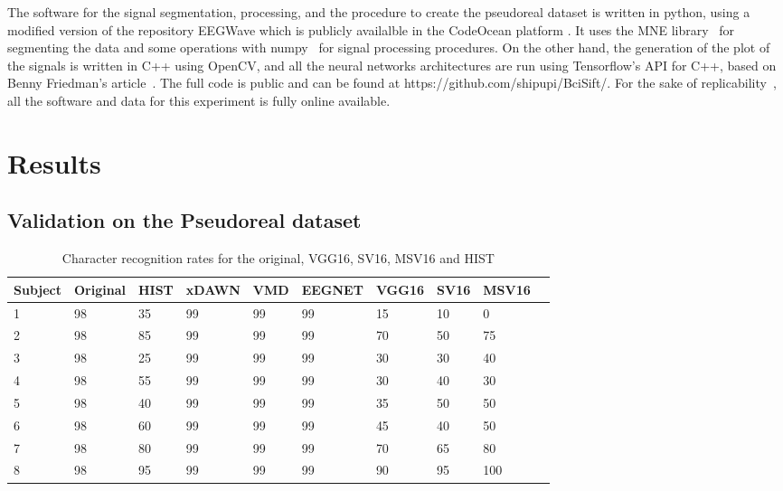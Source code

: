 \documentclass[conference]{IEEEtran}
\begin{document}
The software for the signal segmentation, processing, and the procedure to create the pseudoreal dataset is written in python, using a modified version of the repository EEGWave which is publicly availalble in the CodeOcean platform \cite{Ramele2018EEGWA}. It uses the MNE library~\cite{Gramfort.etal2014} for segmenting the data and some operations with numpy~\cite{Harris.etal2020} for signal processing procedures.
On the other hand, the generation of the plot of the signals is written in C++ using OpenCV, and all the neural networks architectures  are run using Tensorflow's API for C++, based on Benny Friedman's article~\cite{BennyCNN}. The full code is public and can be found at https://github.com/shipupi/BciSift/.  For the sake of replicability~\cite{Pavlov.etal2021}, all the software and data for this experiment is fully online available.

\section{Results}
\label{sec:results}


\subsection{Validation on the Pseudoreal dataset}


\begin{table*}[h]
\centering
\begin{tabular}{ |p{1cm}||p{1cm}|p{1cm}|p{1cm}|p{1cm}|p{1cm}|p{1cm}|p{1cm}|p{1cm}|p{1cm} |}
 \hline
 Subject & Original & HIST & xDAWN & VMD & EEGNET & VGG16 & SV16 & MSV16 \\
 \hline
 1 & 98 & 35 & 99 & 99 & 99 & 15 & 10 & 0 \\
 2 & 98 & 85 & 99 & 99 & 99 & 70 & 50 & 75 \\
 3 & 98 & 25 & 99 & 99 & 99 & 30 & 30 & 40 \\
 4 & 98 & 55 & 99 & 99 & 99 & 30 & 40 & 30 \\
 5 & 98 & 40 & 99 & 99 & 99 & 35 & 50 & 50 \\
 6 & 98 & 60 & 99 & 99 & 99 & 45 & 40 & 50 \\
 7 & 98 & 80 & 99 & 99 & 99 & 70 & 65 & 80 \\
 8 & 98 & 95 & 99 & 99 & 99 & 90 & 95 & 100 \\
 \hline
\end{tabular}
\caption[MSV16 accuracy comparison]{Character recognition rates for the original, VGG16, SV16, MSV16 and HIST}
\label{tab:resultsv1v2v3}
\end{table*}
\end{document}
